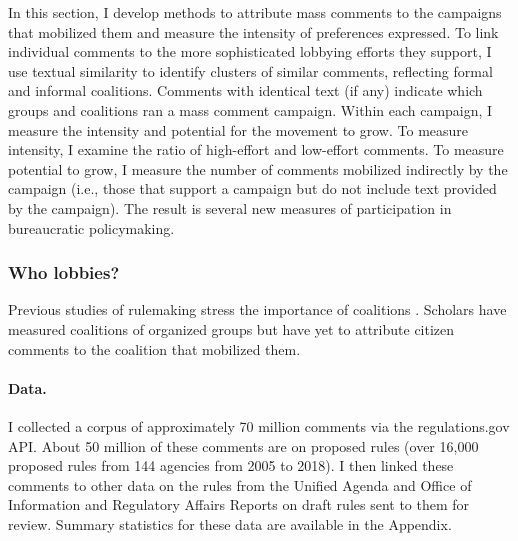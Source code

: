 In this section, I develop methods to attribute mass comments to the campaigns that mobilized them and measure the intensity of preferences expressed. 
To link individual comments to the more sophisticated lobbying efforts they support, I use textual similarity to identify clusters of similar comments, reflecting formal and informal coalitions. Comments with identical text (if any) indicate which groups and coalitions ran a mass comment campaign. Within each campaign, I measure the intensity and potential for the movement to grow. To measure intensity, I examine the ratio of high-effort and low-effort comments. To measure potential to grow, I measure the number of comments mobilized indirectly by the campaign (i.e., those that support a campaign but do not include text provided by the campaign).
The result is several new measures of participation in bureaucratic policymaking. 

\subsubsection{Who lobbies?}
Previous studies of rulemaking stress the importance of coalitions \citep{Yackee2006JOP}. Scholars have measured coalitions of organized groups but have yet to attribute citizen comments to the coalition that mobilized them.


\paragraph{Data.} I collected a corpus of approximately 70 million comments via the regulations.gov API. About 50 million of these comments are on proposed rules (over 16,000 proposed rules from 144 agencies from 2005 to 2018). I then linked these comments to other data on the rules from the Unified Agenda and Office of Information and Regulatory Affairs Reports on draft rules sent to them for review. Summary statistics for these data are available in the Appendix.

